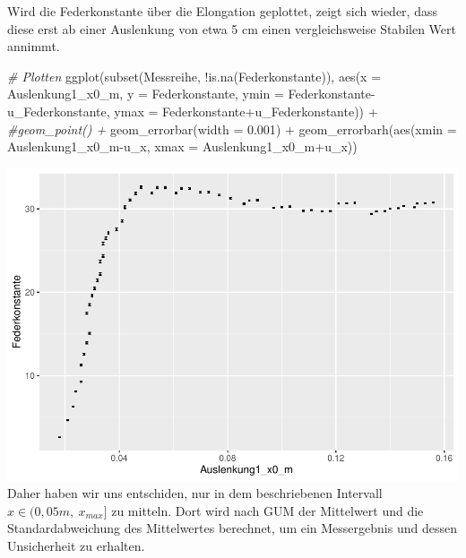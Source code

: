 \documentclass[
]{article}
\newenvironment{Shaded}{\begin{snugshade}}{\end{snugshade}}
\newcommand{\AttributeTok}[1]{\textcolor[rgb]{0.77,0.63,0.00}{#1}}
\newcommand{\CommentTok}[1]{\textcolor[rgb]{0.56,0.35,0.01}{\textit{#1}}}
\newcommand{\FloatTok}[1]{\textcolor[rgb]{0.00,0.00,0.81}{#1}}
\newcommand{\FunctionTok}[1]{\textcolor[rgb]{0.00,0.00,0.00}{#1}}
\newcommand{\NormalTok}[1]{#1}
\newcommand{\SpecialCharTok}[1]{\textcolor[rgb]{0.00,0.00,0.00}{#1}}
\begin{document}
Wird die Federkonstante über die Elongation geplottet, zeigt sich
wieder, dass diese erst ab einer Auslenkung von etwa 5 cm einen
vergleichsweise Stabilen Wert annimmt.

\begin{Shaded}
\begin{Highlighting}[]
\CommentTok{\# Plotten}
\FunctionTok{ggplot}\NormalTok{(}\FunctionTok{subset}\NormalTok{(Messreihe, }\SpecialCharTok{!}\FunctionTok{is.na}\NormalTok{(Federkonstante)), }\FunctionTok{aes}\NormalTok{(}\AttributeTok{x =}\NormalTok{ Auslenkung1\_x0\_m, }
                                                      \AttributeTok{y =}\NormalTok{ Federkonstante,}
                                                      \AttributeTok{ymin =}\NormalTok{ Federkonstante}\SpecialCharTok{{-}}\NormalTok{u\_Federkonstante,}
                                                      \AttributeTok{ymax =}\NormalTok{ Federkonstante}\SpecialCharTok{+}\NormalTok{u\_Federkonstante)) }\SpecialCharTok{+} 
  \CommentTok{\#geom\_point() + }
  \FunctionTok{geom\_errorbar}\NormalTok{(}\AttributeTok{width =} \FloatTok{0.001}\NormalTok{) }\SpecialCharTok{+}
  \FunctionTok{geom\_errorbarh}\NormalTok{(}\FunctionTok{aes}\NormalTok{(}\AttributeTok{xmin =}\NormalTok{ Auslenkung1\_x0\_m}\SpecialCharTok{{-}}\NormalTok{u\_x,}
                     \AttributeTok{xmax =}\NormalTok{ Auslenkung1\_x0\_m}\SpecialCharTok{+}\NormalTok{u\_x))}
\end{Highlighting}
\end{Shaded}

\includegraphics{DehnbareStoffe_files/figure-latex/unnamed-chunk-8-1.pdf}
Daher haben wir uns entschiden, nur in dem beschriebenen Intervall
\(x \in (0,05m,\ x_{max}]\) zu mitteln. Dort wird nach GUM der
Mittelwert und die Standardabweichung des Mittelwertes berechnet, um ein
Messergebnis und dessen Unsicherheit zu erhalten.
\end{document}
